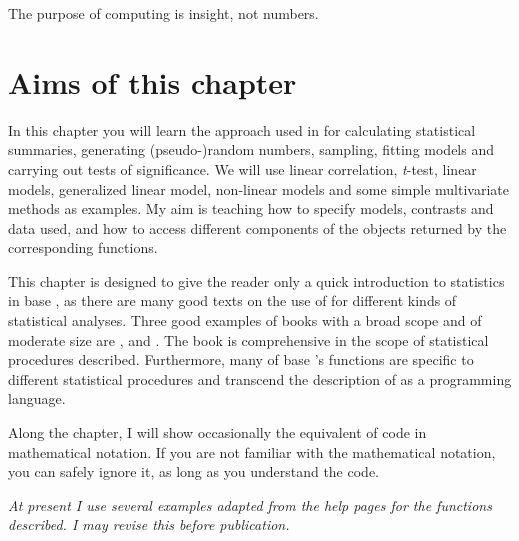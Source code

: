 \documentclass[krantz2]{krantz}\usepackage{knitr}%
\begin{document}
\begin{VF}
The purpose of computing is insight, not numbers.

\end{VF}

\section{Aims of this chapter}

In this chapter you will learn the approach used in \Rlang for calculating statistical summaries, generating (pseudo-)random numbers, sampling, fitting models and carrying out tests of significance. We will use linear correlation, \emph{t}-test, linear models, generalized linear model, non-linear models and some simple multivariate methods as examples. My aim is teaching how to specify models, contrasts and data used, and how to access different components of the objects returned by the corresponding functions.

This chapter is designed to give the reader only a quick introduction to statistics in base \Rlang, as there are many good texts on the use of \Rpgrm for different kinds of statistical analyses. Three good examples of books with a broad scope and of moderate size are  \autocite{Dalgaard2008},  \autocite{Everitt2009} and  \autocite{Zuur2009}. The book  \autocite{Crawley2012} is comprehensive in the scope of statistical procedures described. Furthermore, many of base \R's functions are specific to different statistical procedures and transcend the description of \Rlang as a programming language.

Along the chapter, I will show occasionally the equivalent of \Rlang code in mathematical notation. If you are not familiar with the mathematical notation, you can safely ignore it, as long as you understand the \Rlang code.

\emph{At present I use several examples adapted from the help pages for the functions described. I may revise this before publication.}
\end{document}
